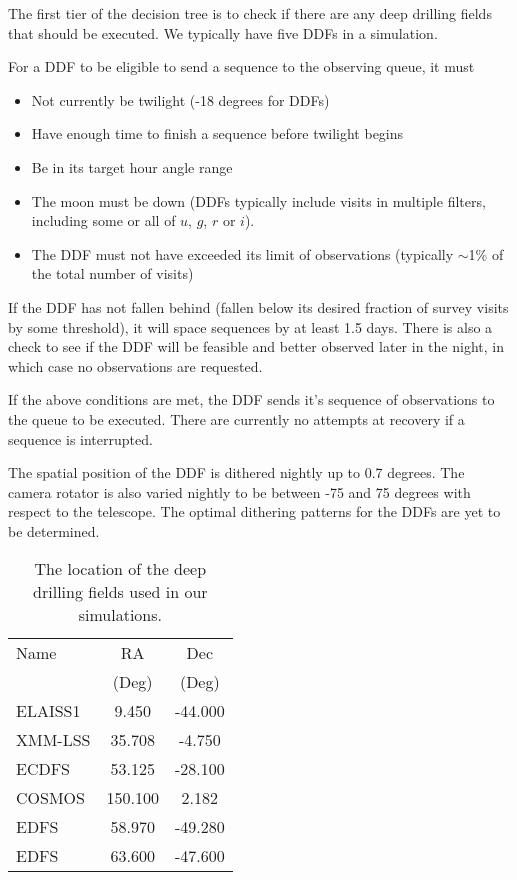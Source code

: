 The first tier of the decision tree is to check if there are any deep drilling fields that should be executed. We typically have five DDFs in a simulation. 

For a DDF to be eligible to send a sequence to the observing queue, it must
\begin{itemize}
\item{Not currently be twilight (-18 degrees for DDFs)}
\item{Have enough time to finish a sequence before twilight begins}
\item{Be in its target hour angle range}
\item{The moon must be down (DDFs typically include visits in multiple filters, including some or all of $u$, $g$, $r$ or $i$). }
\item{The DDF must not have exceeded its limit of observations (typically $\sim$1\% of the total number of visits)}
\end{itemize}

If the DDF has not fallen behind (fallen below its desired fraction of survey visits by some threshold), it will space sequences by at least 1.5 days. There is also a check to see if the DDF will be feasible and better observed later in the night, in which case no observations are requested.

If the above conditions are met, the DDF sends it's sequence of observations to the queue to be executed. There are currently no attempts at recovery if a sequence is interrupted. 

The spatial position of the DDF is dithered nightly up to 0.7 degrees.  The camera rotator is also varied nightly to be between -75 and 75 degrees with respect to the telescope. The optimal dithering patterns for the DDFs are yet to be determined.

\begin{table}
\begin{centering}
\begin{tabular}{lcc}
\toprule
    Name &      RA &     Dec \\
    &          (Deg) &  (Deg) \\
    \hline
 ELAISS1 &   9.450 & -44.000 \\
 XMM-LSS &  35.708 &  -4.750 \\
   ECDFS &  53.125 & -28.100 \\
  COSMOS & 150.100 &   2.182 \\
    EDFS &  58.970 & -49.280 \\
    EDFS &  63.600 & -47.600 \\
    \hline
\end{tabular}
\caption{The location of the deep drilling fields used in our simulations.}\label{table:ddfs}
\end{centering}
\end{table}



